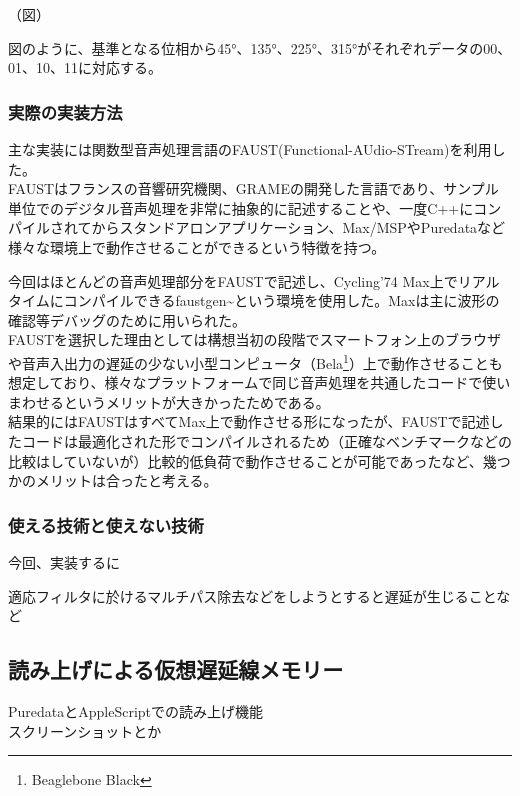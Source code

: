 （図）

図のように、基準となる位相から45°、135°、225°、315°がそれぞれデータの00、01、10、11に対応する。

\subsubsection{実際の実装方法}\label{ux5b9fux969bux306eux5b9fux88c5ux65b9ux6cd5}

主な実装には関数型音声処理言語のFAUST(Functional-AUdio-STream)を利用した。\\
FAUSTはフランスの音響研究機関、GRAMEの開発した言語であり、サンプル単位でのデジタル音声処理を非常に抽象的に記述することや、一度C++にコンパイルされてからスタンドアロンアプリケーション、Max/MSPやPuredataなど様々な環境上で動作させることができるという特徴を持つ。

今回はほとんどの音声処理部分をFAUSTで記述し、Cycling'74
Max上でリアルタイムにコンパイルできるfaustgen\textasciitilde{}という環境を使用した。Maxは主に波形の確認等デバッグのために用いられた。\\
FAUSTを選択した理由としては構想当初の段階でスマートフォン上のブラウザや音声入出力の遅延の少ない小型コンピュータ（Bela\footnote{Beaglebone
  Black}）上で動作させることも想定しており、様々なプラットフォームで同じ音声処理を共通したコードで使いまわせるというメリットが大きかったためである。\\
結果的にはFAUSTはすべてMax上で動作させる形になったが、FAUSTで記述したコードは最適化された形でコンパイルされるため（正確なベンチマークなどの比較はしていないが）比較的低負荷で動作させることが可能であったなど、幾つかのメリットは合ったと考える。

\subsubsection{使える技術と使えない技術}\label{ux4f7fux3048ux308bux6280ux8853ux3068ux4f7fux3048ux306aux3044ux6280ux8853}

今回、実装するに

適応フィルタに於けるマルチパス除去などをしようとすると遅延が生じることなど

\subsection{読み上げによる仮想遅延線メモリー}\label{ux8aadux307fux4e0aux3052ux306bux3088ux308bux4eeeux60f3ux9045ux5ef6ux7ddaux30e1ux30e2ux30eaux30fc}

PuredataとAppleScriptでの読み上げ機能\\
スクリーンショットとか

